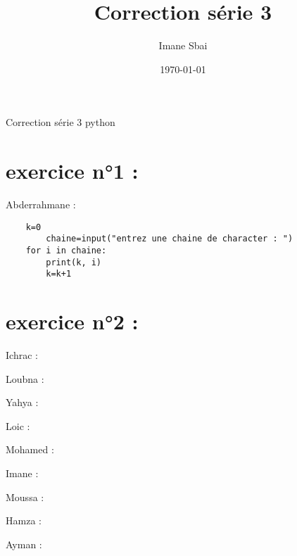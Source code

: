 \documentclass{article}
\title{Correction série 3}
\author{Imane Sbai}
\date {\today}
\begin{document}
\begin{titlepage}
    \begin{center}
Correction s\'{e}rie 3 python
    \end{center}
\end{titlepage}

\section{exercice n°1 :}
	\begin{center}
    		Abderrahmane :
	\end{center} 
	
	\begin{verbatim}
	k=0
    	chaine=input("entrez une chaine de character : ")
	for i in chaine:
   		print(k, i)
	   	k=k+1
	\end{verbatim}
\section{exercice n°2 :}

	\begin{center}
    		Ichrac :
	\end{center}
	
	
	\begin{center}
    		Loubna :
	\end{center} 
	

	\begin{center}
    		Yahya :
	\end{center} 
	

	\begin{center}
    		Loic :
	\end{center} 
	
	
	\begin{center}
    		Mohamed :
	\end{center}
	

	\begin{center}
    		Imane :
	\end{center} 
	
	
    	\begin{center}
    		Moussa :
	\end{center} 
	

    	\begin{center}
    		Hamza :
	\end{center} 


	\begin{center}
    		Ayman :
	\end{center} 
	
\end{document}
